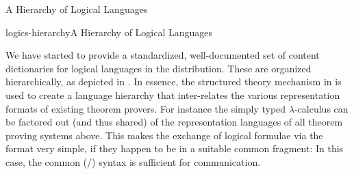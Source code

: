 \begin{tsubsection}[id=integrating-logics]{A Hierarchy of Logical Languages}
\begin{myfig}{logics-hierarchy}{A Hierarchy of Logical Languages}
\end{myfig}
We have started to provide a standardized, well-documented set of content dictionaries for
logical languages in the {\omdoc} distribution. These are organized hierarchically, as
depicted in {}.  In essence, the structured theory mechanism in
{\omdoc} is used to create a language hierarchy that inter-relates the various
representation formats of existing theorem provers. For instance the simply typed
$\lambda$-calculus can be factored out (and thus shared) of the representation languages
of all theorem proving systems above. This makes the exchange of logical formulae
via the {\omdoc} format very simple, if they happen to be in a suitable common fragment:
In this case, the common ({\openmath}/{\omdoc}) syntax is sufficient for communication.
\end{tsubsection}

